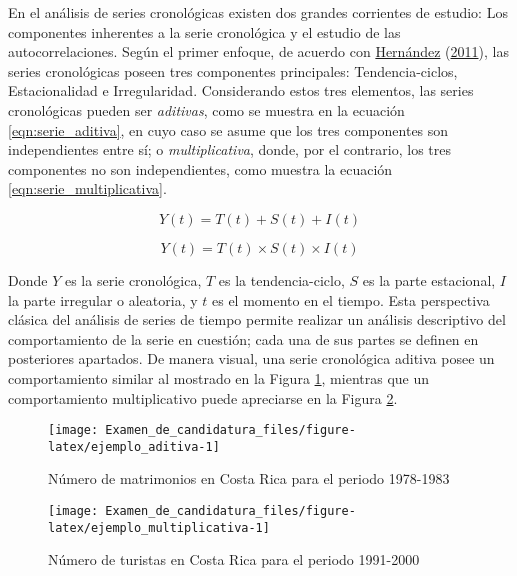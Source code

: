 \documentclass[
]{article}
\begin{document}
En el análisis de series cronológicas existen dos grandes corrientes de
estudio: Los componentes inherentes a la serie cronológica y el estudio
de las autocorrelaciones. Según el primer enfoque, de acuerdo con
\protect\hyperlink{ref-oscarh-1}{Hernández}
(\protect\hyperlink{ref-oscarh-1}{2011}), las series cronológicas poseen
tres componentes principales: Tendencia-ciclos, Estacionalidad e
Irregularidad. Considerando estos tres elementos, las series
cronológicas pueden ser \emph{aditivas}, como se muestra en la ecuación
\ref{eqn:serie_aditiva}, en cuyo caso se asume que los tres componentes
son independientes entre sí; o \emph{multiplicativa}, donde, por el
contrario, los tres componentes no son independientes, como muestra la
ecuación \ref{eqn:serie_multiplicativa}.

\begin{equation}
\label{eqn:serie_aditiva}
Y(t)=T(t)+S(t)+I(t)
\end{equation}

\begin{equation}
\label{eqn:serie_multiplicativa}
Y(t)=T(t)\times S(t)\times I(t)
\end{equation}

Donde \(Y\) es la serie cronológica, \(T\) es la tendencia-ciclo, \(S\)
es la parte estacional, \(I\) la parte irregular o aleatoria, y \(t\) es
el momento en el tiempo. Esta perspectiva clásica del análisis de series
de tiempo permite realizar un análisis descriptivo del comportamiento de
la serie en cuestión; cada una de sus partes se definen en posteriores
apartados. De manera visual, una serie cronológica aditiva posee un
comportamiento similar al mostrado en la Figura
\ref{fig:ejemplo_aditiva}, mientras que un comportamiento multiplicativo
puede apreciarse en la Figura \ref{fig:ejemplo_multiplicativa}.

\begin{figure}[H]
\texttt{[image: Examen\_de\_candidatura\_files/figure-latex/ejemplo\_aditiva-1]} \caption{Número de matrimonios en Costa Rica para el periodo 1978-1983}\label{fig:ejemplo_aditiva}
\end{figure}

\begin{figure}[H]
\texttt{[image: Examen\_de\_candidatura\_files/figure-latex/ejemplo\_multiplicativa-1]} \caption{Número de turistas en Costa Rica para el periodo 1991-2000}\label{fig:ejemplo_multiplicativa}
\end{figure}
\end{document}
